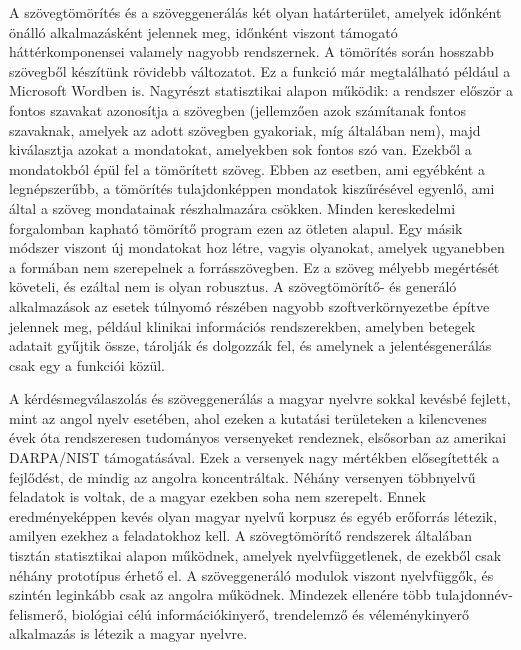 \begin{multicols}{2}
A szövegtömörítés és a szöveggenerálás két olyan határterület, amelyek időnként önálló alkalmazásként jelennek meg, időn\-ként viszont támogató háttérkomponensei valamely nagyobb rendszernek. A tömörítés során hosszabb szövegből ké\-szí\-tünk rövidebb változatot. Ez a funkció már megtalálható például a Microsoft Wordben is. Nagyrészt statisztikai alapon működik: a rendszer először a fontos szavakat azonosítja a szövegben (jel\-lem\-ző\-en azok számítanak fontos szavaknak, amelyek az adott szövegben gyakoriak, míg általában nem), majd kiválasztja azokat a mondatokat, amelyekben sok fontos szó van. Ezekből a mondatokból épül fel a tömörített szöveg. Ebben az esetben, ami egyébként a legnépszerűbb, a tömörítés tulajdonképpen mondatok kiszűrésével egyenlő, ami által a szöveg mondatainak rész\-hal\-ma\-zá\-ra csök\-ken. Minden kereskedelmi forgalomban kapható tömörítő program ezen az ötleten alapul. Egy másik módszer viszont új mondatokat hoz létre, vagyis olyanokat, amelyek ugyanebben a formában nem szerepelnek a forrásszövegben. Ez a szöveg mélyebb megértését követeli, és ezáltal nem is olyan robusztus. A szövegtömörítő- és generáló alkalmazások az esetek túlnyomó részében nagyobb szoftverkörnyezetbe építve jelennek meg, például klinikai információs rendszerekben, amelyben betegek adatait gyűjtik össze, tárolják és dolgozzák fel, és amelynek a jelentésgenerálás csak egy a funkciói közül.  


A kérdésmegválaszolás és szöveggenerálás a magyar nyelvre sokkal kevésbé fejlett, mint az angol nyelv esetében, ahol ezeken a kutatási területeken a kilencvenes évek óta rendszeresen tudományos versenyeket rendeznek, elsősorban az amerikai DAR\-PA/NIST támogatásával. Ezek a ver\-se\-nyek nagy mértékben elősegítették a fej\-lő\-dést, de mindig az angolra kon\-cent\-rál\-tak. Néhány versenyen többnyelvű feladatok is voltak, de a magyar ezekben soha nem szerepelt. Ennek eredményeképpen kevés olyan magyar nyelvű korpusz és egyéb erőforrás létezik, amilyen ezekhez a feladatokhoz kell. A szövegtömörítő rendszerek általában tisztán statisztikai alapon működnek, amelyek nyelvfüggetlenek, de ezekből csak néhány prototípus érhető el. A szöveggeneráló modulok viszont nyelvfüggők, és szintén leginkább csak az angolra működnek. Mindezek ellenére több tulajdonnév-felismerő, biológiai célú  információkinyerő, trend\-elem\-ző és véleménykinyerő alkalmazás is létezik a magyar nyelvre. 


\end{multicols}
